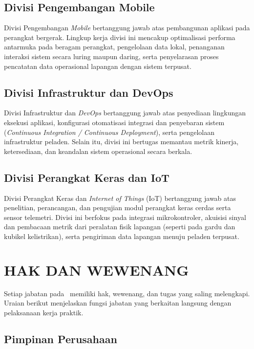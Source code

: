 \subsection{Divisi Pengembangan Mobile}

Divisi Pengembangan \textit{Mobile} bertanggung jawab atas pembangunan aplikasi pada perangkat bergerak. Lingkup kerja divisi ini mencakup optimalisasi performa antarmuka pada beragam perangkat, pengelolaan data lokal, penanganan interaksi sistem secara luring maupun daring, serta penyelarasan proses pencatatan data operasional lapangan dengan sistem terpusat.

\subsection{Divisi Infrastruktur dan DevOps}

Divisi Infrastruktur dan \textit{DevOps} bertanggung jawab atas penyediaan lingkungan eksekusi aplikasi, konfigurasi otomatisasi integrasi dan penyebaran sistem (\textit{Continuous Integration / Continuous Deployment}), serta pengelolaan infrastruktur peladen. Selain itu, divisi ini bertugas memantau metrik kinerja, ketersediaan, dan keandalan sistem operasional secara berkala.

\subsection{Divisi Perangkat Keras dan IoT}

Divisi Perangkat Keras dan \textit{Internet of Things} (IoT) bertanggung jawab atas penelitian, perancangan, dan pengujian modul perangkat keras cerdas serta sensor telemetri. Divisi ini berfokus pada integrasi mikrokontroler, akuisisi sinyal dan pembacaan metrik dari peralatan fisik lapangan (seperti pada gardu dan kubikel kelistrikan), serta pengiriman data lapangan menuju peladen terpusat.

\section{HAK DAN WEWENANG}

Setiap jabatan pada \NamaPerusahaan\ memiliki hak, wewenang, dan tugas yang saling melengkapi. Uraian berikut menjelaskan fungsi jabatan yang berkaitan langsung dengan pelaksanaan kerja praktik.

\subsection{Pimpinan Perusahaan}

